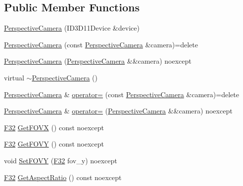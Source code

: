 \subsection*{Public Member Functions}
\begin{DoxyCompactItemize}
\item 
\hyperlink{classmage_1_1rendering_1_1_perspective_camera_ab478643eb5a2285d330b228287cc0187}{Perspective\+Camera} (I\+D3\+D11\+Device \&device)
\item 
\hyperlink{classmage_1_1rendering_1_1_perspective_camera_ad4b54caa651462e68089436a8a1f8dc0}{Perspective\+Camera} (const \hyperlink{classmage_1_1rendering_1_1_perspective_camera}{Perspective\+Camera} \&camera)=delete
\item 
\hyperlink{classmage_1_1rendering_1_1_perspective_camera_a3d342252cefbffe69537e1ccc95a379a}{Perspective\+Camera} (\hyperlink{classmage_1_1rendering_1_1_perspective_camera}{Perspective\+Camera} \&\&camera) noexcept
\item 
virtual \hyperlink{classmage_1_1rendering_1_1_perspective_camera_ac9bc0faebd323ca26d0311e35612d219}{$\sim$\+Perspective\+Camera} ()
\item 
\hyperlink{classmage_1_1rendering_1_1_perspective_camera}{Perspective\+Camera} \& \hyperlink{classmage_1_1rendering_1_1_perspective_camera_ac9119d544f7ca6c4fbe1a6c5118bcd66}{operator=} (const \hyperlink{classmage_1_1rendering_1_1_perspective_camera}{Perspective\+Camera} \&camera)=delete
\item 
\hyperlink{classmage_1_1rendering_1_1_perspective_camera}{Perspective\+Camera} \& \hyperlink{classmage_1_1rendering_1_1_perspective_camera_ac5b98cb14cd16dffd1a46c4e52ef72a8}{operator=} (\hyperlink{classmage_1_1rendering_1_1_perspective_camera}{Perspective\+Camera} \&\&camera) noexcept
\item 
\hyperlink{namespacemage_aa97e833b45f06d60a0a9c4fc22ae02c0}{F32} \hyperlink{classmage_1_1rendering_1_1_perspective_camera_a3308ee4d7ec6830c04ed3f4fc01f81ac}{Get\+F\+O\+VX} () const noexcept
\item 
\hyperlink{namespacemage_aa97e833b45f06d60a0a9c4fc22ae02c0}{F32} \hyperlink{classmage_1_1rendering_1_1_perspective_camera_ae6be4458a427e626ec7299c5898ffd38}{Get\+F\+O\+VY} () const noexcept
\item 
void \hyperlink{classmage_1_1rendering_1_1_perspective_camera_ab9ae2a2ae24ff7934a31305a1a0decf7}{Set\+F\+O\+VY} (\hyperlink{namespacemage_aa97e833b45f06d60a0a9c4fc22ae02c0}{F32} fov\+\_\+y) noexcept
\item 
\hyperlink{namespacemage_aa97e833b45f06d60a0a9c4fc22ae02c0}{F32} \hyperlink{classmage_1_1rendering_1_1_perspective_camera_a835369a1652074eed3a7d09e01a40430}{Get\+Aspect\+Ratio} () const noexcept

\end{DoxyCompactItemize}
